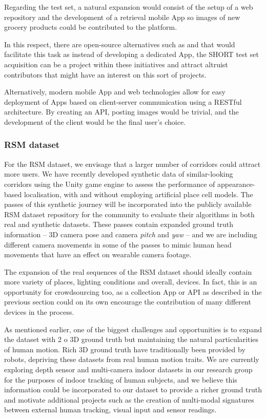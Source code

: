 Regarding the test set, a natural expansion would consist of the setup of a web repository and the development of a retrieval mobile App so images of new grocery products could be contributed to the platform.

In this respect, there are open-source alternatives such as \cite{apple} and \cite{google} that would facilitate this task as instead of developing a dedicated App, the SHORT test set acquisition can be a project within these initiatives and attract altruist contributors that might have an interest on this sort of projects.

Alternatively, modern mobile App and web technologies allow for easy deployment of Apps based on client-server communication using a RESTful architecture. By creating an API, posting images would be trivial, and the development of the client would be the final user's choice.

\subsubsection{RSM dataset}
\label{sec:futureRSM}
For the RSM dataset, we envisage that a larger number of corridors could attract more users. We have recently developed synthetic data of similar-looking corridors using the Unity game engine to assess the performance of appearance-based localisation, with and without employing artificial place cell models. The passes of this synthetic journey will be incorporated into the publicly available RSM dataset repository for the community to evaluate their algorithms in both real and synthetic datasets. These passes contain expanded ground truth information -- 3D camera pose and camera \textit{pitch} and \textit{yaw} --  and we are including different camera movements in some of the passes to mimic human head movements that have an effect on wearable camera footage.

The expansion of the real sequences of the RSM dataset should ideally contain more variety of places, lighting conditions and overall, devices. In fact, this is an opportunity for crowdsourcing too, as a collection App or API as described in the previous section could on its own encourage the contribution of many different devices in the process.

As mentioned earlier, one of the biggest challenges and opportunities is to expand the dataset with 2 o 3D ground truth but maintaining the natural particularities of human motion. Rich 3D ground truth have traditionally been provided by ro\-bots, depriving these datasets from real human motion traits. We are currently exploring depth sensor and multi-camera indoor datasets in our research group for the purposes of indoor tracking of human subjects, and we believe this information could be incorporated to our dataset to provide a richer ground truth and motivate additional projects such as the creation of multi-modal signatures between external human tracking, visual input and sensor readings.

